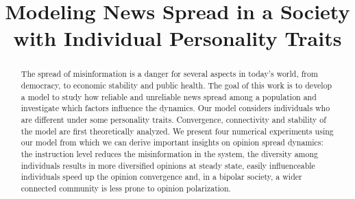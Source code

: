\documentclass[10pt,conference]{IEEEtran}
\begin{document}
\title{Modeling News Spread in a Society with Individual Personality Traits\\}

\author{
\and
{}
\and
{}
}

\maketitle

\begin{abstract}
The spread of misinformation is a danger for several aspects in today's world, from democracy, to economic stability and public health. The goal of this work is to develop a model to study how reliable and unreliable news spread among a population and investigate which factors influence the dynamics. Our model considers individuals who are different under some personality traits. Convergence, connectivity and stability of the model are first theoretically analyzed. We present four numerical experiments using our model from which we can derive important insights on opinion spread dynamics: the instruction level reduces the misinformation in the system, the diversity among individuals results in more diversified opinions at steady state, easily influenceable individuals speed up the opinion convergence and, in a bipolar society, a wider connected community is less prone to opinion polarization.
\end{abstract}











%
\end{document}
